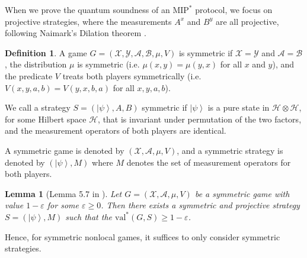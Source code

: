 \documentclass[11pt]{article}
\theoremstyle{plain}
\newtheorem{lemma}[theorem]{Lemma}
\theoremstyle{definition}
\newtheorem{definition}[theorem]{Definition}
\newcommand {\ket} [1] {\ensuremath{ \left| #1 \right\rangle }}
\newcommand{\ep} {\ensuremath{\varepsilon}}
\newcommand{\x}{\otimes}
\newcommand{\calH}{\mathcal{H}}
\newcommand{\calX}{\mathcal{X}}
\newcommand{\calY}{\mathcal{Y}}
\newcommand{\calA}{\mathcal{A}}
\newcommand{\calB}{\mathcal{B}}
\newcommand{\1}{\mathbb{1}} %
\newcommand{\MIP}{\mathrm{MIP}}
\newcommand{\val}{\mathrm{val}}
\begin{document}
When we prove the quantum soundness of an $\MIP^\ast$ protocol, we focus on projective strategies, where the measurements
$A^x$ and $B^y$ are all projective, following Naimark's Dilation theorem \cite[Theorem 5.1]{JNVWYuen'20}.
\begin{definition}
    A game $G = (\calX, \calY, \calA, \calB, \mu, V)$ is symmetric if $\calX = \calY$ and $\calA = \calB$, the distribution $\mu$
    is symmetric (i.e. $\mu(x,y) = \mu(y,x)$ for all $x$ and $y$), and the predicate $V$ treats both players symmetrically (i.e. 
    $V(x,y,a,b) = V(y,x,b,a)$ for all $x,y,a,b$).

    We call a strategy $S = (\ket{\psi}, A, B)$ symmetric if $\ket{\psi}$ is a pure state in $\calH \x \calH$, for some Hilbert space $\calH$, that is invariant under permutation of the two factors, and the measurement operators of both players are identical. 
\end{definition}
A symmetric game is denoted by $(\calX, \calA, \mu, V)$, and a symmetric strategy is denoted by $(\ket{\psi}, M)$
where $M$ denotes the set of measurement operators for both players.
\begin{lemma}[Lemma 5.7 in \cite{JNVWY'20}]
    Let $G = (\calX, \calA, \mu, V)$ be a symmetric game with value $1 - \ep$ for some $\ep \geq 0$.
    Then there exists a symmetric and projective strategy $S = (\ket{\psi}, M)$ such that the $\val^\ast(G,S)\geq 1- \ep$.
\end{lemma}
Hence, for symmetric nonlocal games, it suffices to only consider symmetric strategies.

\end{document}
